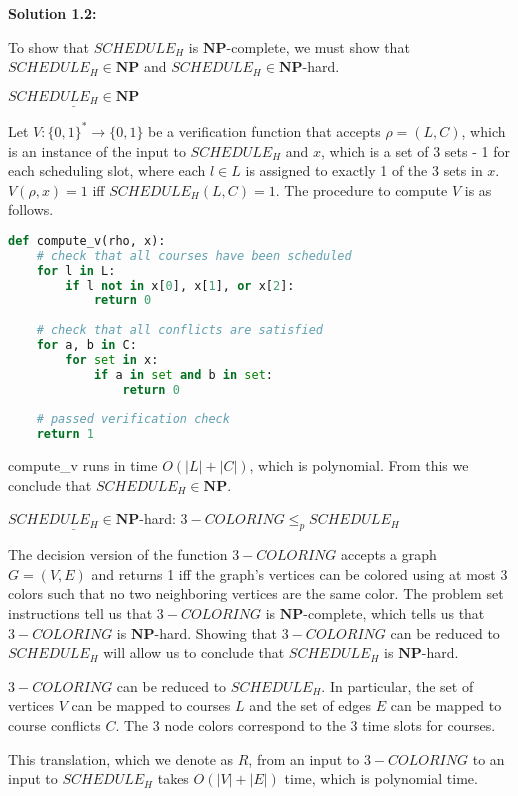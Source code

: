 \documentclass[11pt]{article}
\begin{document}
\textbf{Solution 1.2:}

To show that $SCHEDULE_H$ is \(\mathbf{NP}\)-complete, we must show that $SCHEDULE_H \in \mathbf{NP}$ and $SCHEDULE_H \in \mathbf{NP}$-hard.

$\underline{SCHEDULE_H \in \mathbf{NP}}$

Let $V: \{0, 1\}^* \to \{0, 1\}$ be a verification function that accepts $\rho = (L, C)$, which is an instance of the input to $SCHEDULE_H$ and $x$, which is a set of 3 sets - 1 for each scheduling slot, where each $l \in L$ is assigned to exactly 1 of the 3 sets in $x$. $V(\rho, x) = 1$ iff $SCHEDULE_H(L, C) = 1$. The procedure to compute $V$ is as follows.

\begin{lstlisting}[language=Python]
def compute_v(rho, x):
    # check that all courses have been scheduled
    for l in L:
        if l not in x[0], x[1], or x[2]:
            return 0
    
    # check that all conflicts are satisfied
    for a, b in C:
        for set in x:
            if a in set and b in set:
                return 0
    
    # passed verification check
    return 1
\end{lstlisting}

compute\_v runs in time $O(|L| + |C|)$, which is polynomial. From this we conclude that $SCHEDULE_H \in \mathbf{NP}$.

$\underline{SCHEDULE_H \in \mathbf{NP}}$-hard: $3-COLORING \leq_p SCHEDULE_H$

The decision version of the function $3-COLORING$ accepts a graph $G = (V, E)$ and returns 1 iff the graph's vertices can be colored using at most 3 colors such that no two neighboring vertices are the same color. The problem set instructions tell us that $3-COLORING$ is \(\mathbf{NP}\)-complete, which tells us that $3-COLORING$ is $\mathbf{NP}$-hard. Showing that $3-COLORING$ can be reduced to $SCHEDULE_H$ will allow us to conclude that $SCHEDULE_H$ is $\mathbf{NP}$-hard.

$3-COLORING$ can be reduced to $SCHEDULE_H$. In particular, the set of vertices $V$ can be mapped to courses $L$ and the set of edges $E$ can be mapped to course conflicts $C$. The 3 node colors correspond to the 3 time slots for courses.

This translation, which we denote as $R$, from an input to $3-COLORING$ to an input to $SCHEDULE_H$ takes $O(|V| + |E|)$ time, which is polynomial time.
\end{document}
